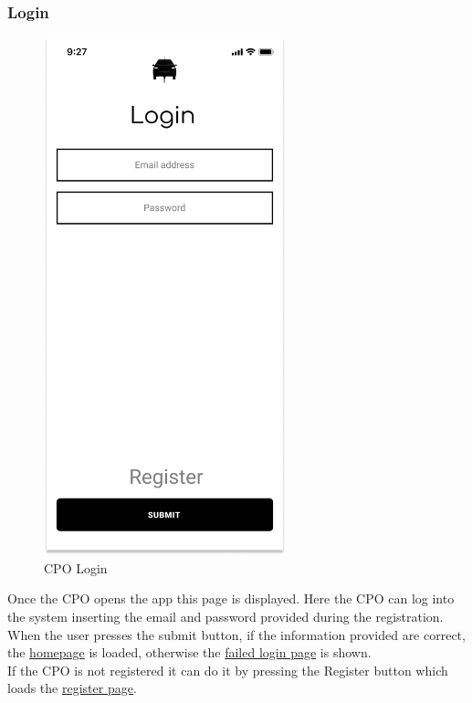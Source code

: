 \subsubsection{Login}
\begin{figure}[H]
    \centering
    \includegraphics[keepaspectratio, height=15cm]{Mockup/CPOAppInterface/Login.png}
    \caption{\ac{CPO} Login}
    \label{site:Login}
\end{figure}
Once the \ac{CPO} opens the app this page is displayed. Here the \ac{CPO} can log into the system inserting the email and password provided during the registration. When the user presses the submit button, if the information provided are correct, the \hyperref[site:Homepage]{homepage} is loaded, otherwise the \hyperref[site:FailedLogin]{failed login page} is shown.\\
If the \ac{CPO} is not registered it can do it by pressing the Register button which loads the \hyperref[site:Register]{register page}.
